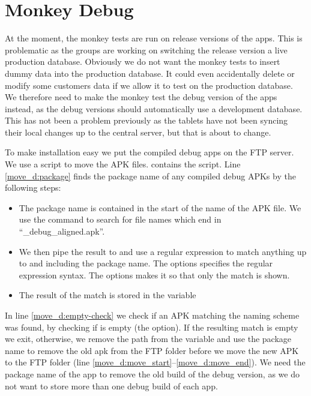 \chapter{Monkey Debug}
At the moment, the monkey tests are run on release versions of the apps. This is problematic as the \db groups are working on switching the release version a live production database. Obviously we do not want the monkey tests to insert dummy data into the production database. It could even accidentally delete or modify some customers data if we allow it to test on the production database. We therefore need to make the monkey test the debug version of the apps instead, as the debug versions should automatically use a development database. This has not been a problem previously as the tablets have not been syncing their local changes up to the central server, but that is about to change.

To make installation easy we put the compiled debug apps on the FTP server. We use a  script to move the APK files.  contains the script. Line \ref{move_d:package} finds the package name of any compiled debug APKs by the following steps:

\begin{itemize}
  \item The package name is contained in the start of the name of the APK file. We use the  command to search for file names which end in ``\_debug\_aligned.apk''.
  \item We then pipe the result to  and use a regular expression to match anything up to and including the package name. The  options specifies the regular expression syntax. The  options makes it so that only the match is shown.
  \item The result of the match is stored in the variable 
\end{itemize}

In line \ref{move_d:empty-check} we check if an APK matching the naming scheme was found, by checking if  is empty (the  option). If the resulting match is empty we exit, otherwise, we remove the path from the variable  and use the package name to remove the old apk from the FTP folder before we move the new APK to the FTP folder (line \ref{move_d:move_start}--\ref{move_d:move_end}). We need the package name of the app to remove the old build of the debug version, as we do not want to store more than one debug build of each app.

